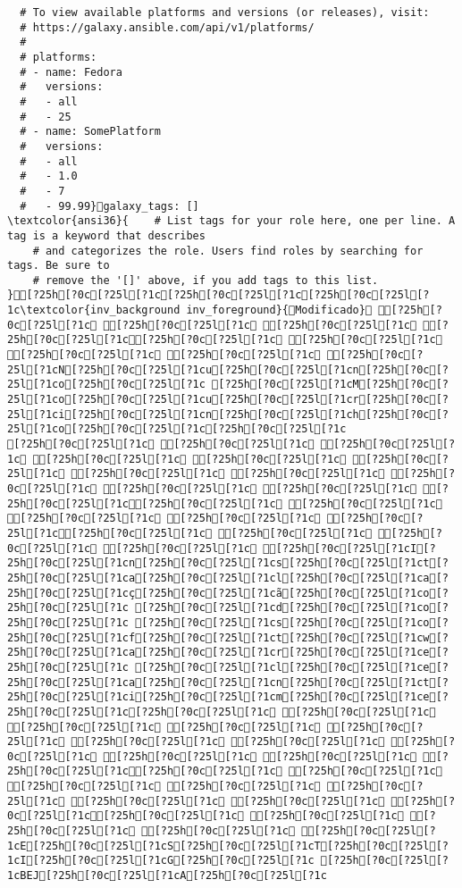\documentclass{scrartcl}
\begin{document}
\begin{Verbatim}
  # To view available platforms and versions (or releases), visit:
  # https://galaxy.ansible.com/api/v1/platforms/
  #
  # platforms:
  # - name: Fedora
  #   versions:
  #   - all
  #   - 25
  # - name: SomePlatform
  #   versions:
  #   - all
  #   - 1.0
  #   - 7
  #   - 99.99}galaxy_tags: []
\textcolor{ansi36}{    # List tags for your role here, one per line. A tag is a keyword that describes
    # and categorizes the role. Users find roles by searching for tags. Be sure to
    # remove the '[]' above, if you add tags to this list.
}[?25h[?0c[?25l[?1c[?25h[?0c[?25l[?1c[?25h[?0c[?25l[?1c\textcolor{inv_background inv_foreground}{Modificado} [?25h[?0c[?25l[?1c [?25h[?0c[?25l[?1c [?25h[?0c[?25l[?1c [?25h[?0c[?25l[?1c[?25h[?0c[?25l[?1c [?25h[?0c[?25l[?1c [?25h[?0c[?25l[?1c [?25h[?0c[?25l[?1c [?25h[?0c[?25l[?1cN[?25h[?0c[?25l[?1cu[?25h[?0c[?25l[?1cn[?25h[?0c[?25l[?1co[?25h[?0c[?25l[?1c [?25h[?0c[?25l[?1cM[?25h[?0c[?25l[?1co[?25h[?0c[?25l[?1cu[?25h[?0c[?25l[?1cr[?25h[?0c[?25l[?1ci[?25h[?0c[?25l[?1cn[?25h[?0c[?25l[?1ch[?25h[?0c[?25l[?1co[?25h[?0c[?25l[?1c[?25h[?0c[?25l[?1c
[?25h[?0c[?25l[?1c [?25h[?0c[?25l[?1c [?25h[?0c[?25l[?1c [?25h[?0c[?25l[?1c [?25h[?0c[?25l[?1c [?25h[?0c[?25l[?1c [?25h[?0c[?25l[?1c [?25h[?0c[?25l[?1c [?25h[?0c[?25l[?1c [?25h[?0c[?25l[?1c [?25h[?0c[?25l[?1c [?25h[?0c[?25l[?1c[?25h[?0c[?25l[?1c [?25h[?0c[?25l[?1c [?25h[?0c[?25l[?1c [?25h[?0c[?25l[?1c [?25h[?0c[?25l[?1c[?25h[?0c[?25l[?1c [?25h[?0c[?25l[?1c [?25h[?0c[?25l[?1c [?25h[?0c[?25l[?1c [?25h[?0c[?25l[?1cI[?25h[?0c[?25l[?1cn[?25h[?0c[?25l[?1cs[?25h[?0c[?25l[?1ct[?25h[?0c[?25l[?1ca[?25h[?0c[?25l[?1cl[?25h[?0c[?25l[?1ca[?25h[?0c[?25l[?1cç[?25h[?0c[?25l[?1cã[?25h[?0c[?25l[?1co[?25h[?0c[?25l[?1c [?25h[?0c[?25l[?1cd[?25h[?0c[?25l[?1co[?25h[?0c[?25l[?1c [?25h[?0c[?25l[?1cs[?25h[?0c[?25l[?1co[?25h[?0c[?25l[?1cf[?25h[?0c[?25l[?1ct[?25h[?0c[?25l[?1cw[?25h[?0c[?25l[?1ca[?25h[?0c[?25l[?1cr[?25h[?0c[?25l[?1ce[?25h[?0c[?25l[?1c [?25h[?0c[?25l[?1cl[?25h[?0c[?25l[?1ce[?25h[?0c[?25l[?1ca[?25h[?0c[?25l[?1cn[?25h[?0c[?25l[?1ct[?25h[?0c[?25l[?1ci[?25h[?0c[?25l[?1cm[?25h[?0c[?25l[?1ce[?25h[?0c[?25l[?1c[?25h[?0c[?25l[?1c [?25h[?0c[?25l[?1c [?25h[?0c[?25l[?1c [?25h[?0c[?25l[?1c [?25h[?0c[?25l[?1c [?25h[?0c[?25l[?1c [?25h[?0c[?25l[?1c [?25h[?0c[?25l[?1c [?25h[?0c[?25l[?1c [?25h[?0c[?25l[?1c [?25h[?0c[?25l[?1c[?25h[?0c[?25l[?1c [?25h[?0c[?25l[?1c [?25h[?0c[?25l[?1c [?25h[?0c[?25l[?1c [?25h[?0c[?25l[?1c [?25h[?0c[?25l[?1c [?25h[?0c[?25l[?1c [?25h[?0c[?25l[?1c[?25h[?0c[?25l[?1c [?25h[?0c[?25l[?1c [?25h[?0c[?25l[?1c [?25h[?0c[?25l[?1c [?25h[?0c[?25l[?1cE[?25h[?0c[?25l[?1cS[?25h[?0c[?25l[?1cT[?25h[?0c[?25l[?1cI[?25h[?0c[?25l[?1cG[?25h[?0c[?25l[?1c [?25h[?0c[?25l[?1cBEJ[?25h[?0c[?25l[?1cA[?25h[?0c[?25l[?1c

\end{Verbatim}
\end{document}
